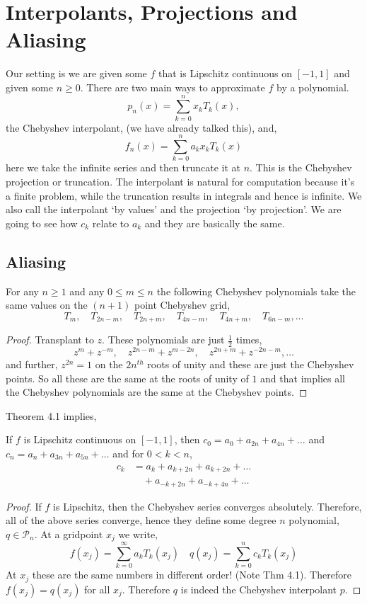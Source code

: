 
\section{Interpolants, Projections and Aliasing}
Our setting is we are given some $f$ that is Lipschitz continuous on $[-1, 1]$ and given some $n \ge 0$. There are two main ways to approximate $f$ by a polynomial.
$$ p_n(x) = \sum_{k=0}^n x_kT_k(x), $$
the Chebyshev interpolant, (we have already talked this), and,
$$ f_n(x) = \sum_{k = 0}^n a_k x_kT_k(x) $$
here we take the infinite series and then truncate it at $n$. This is the Chebyshev projection or truncation. The interpolant is natural for computation because it's a finite problem, while the truncation results in integrals and hence is infinite. We also call the interpolant `by values' and the projection `by projection'. We are going to see how $c_k$ relate to $a_k$ and they are basically the same.\\

\noindent
\subsection{Aliasing}
\begin{nthm}
  For any $n \ge 1$ and any $0 \le m \le n$ the following Chebyshev polynomials take the same values on the $(n + 1)$ point Chebyshev grid,
  $$ T_m, \quad T_{2n-m}, \quad T_{2n+m}, \quad T_{4n - m}, \quad T_{4n+m}, \quad T_{6n - m}, \dots $$
\end{nthm}
\begin{proof}
  Transplant to $z$. These polynomials are just $\frac{1}{2}$ times,
  $$ z^m + z^{-m}, \quad z^{2n-m} + z^{m - 2n}, \quad z^{2n + m} + z^{-2n-m}, \dots $$
  and further, $z^{2n} = 1$ on the $2n^{th}$ roots of unity and these are just the Chebyshev points. So all these are the same at the roots of unity of $1$ and that implies all the Chebyshev polynomials are the same at the Chebyshev points.
\end{proof}

\noindent
Theorem 4.1 implies,
\begin{nthm}
  If $f$ is Lipschitz continuous on $[-1, 1]$, then $c_0 = a_0 + a_{2n} + a_{4n} + \dots$ and $ c_{n} = a_n + a_{3n} + a_{5n} + \dots $ and for $0 < k < n$,
  \begin{align*}
    c_k &= a_k + a_{k+2n} + a_{k+2n} + \dots \\
    &\quad + a_{-k+2n} + a_{-k + 4n} + \dots
  \end{align*}
\end{nthm}
\begin{proof}
  If $f$ is Lipschitz, then the Chebyshev series converges absolutely. Therefore, all of the above series converge, hence they define some degree $n$ polynomial, $q \in \mathcal{P}_n$. At a gridpoint $x_j$ we write,
  $$ f(x_j) = \sum_{k=0}^\infty a_kT_k(x_j) \quad q(x_j) = \sum_{k=0}^n c_kT_k(x_j) $$
  At $x_j$ these are the same numbers in different order! (Note Thm 4.1). Therefore $f(x_j) = q(x_j)$ for all $x_j$. Therefore $q$ is indeed the Chebyshev interpolant $p$.
\end{proof}

